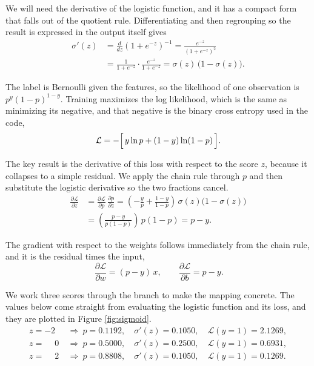 \documentclass[12pt,letterpaper]{article}
\begin{document}
We will need the derivative of the logistic function, and it has a compact form
that falls out of the quotient rule. Differentiating and then regrouping so the
result is expressed in the output itself gives
\begin{align*}
\sigma'(z)
  &= \frac{d}{dz}\left(1 + e^{-z}\right)^{-1}
   = \frac{e^{-z}}{\left(1 + e^{-z}\right)^2} \\
  &= \frac{1}{1+e^{-z}}\cdot\frac{e^{-z}}{1+e^{-z}}
   = \sigma(z)\,\bigl(1 - \sigma(z)\bigr).
\end{align*}

The label is Bernoulli given the features, so the likelihood of one observation
is $p^{y}(1-p)^{1-y}$. Training maximizes the log likelihood, which is the same
as minimizing its negative, and that negative is the binary cross entropy used
in the code,
\[
\mathcal{L} = -\Bigl[\,y \ln p + (1-y)\ln(1-p)\,\Bigr].
\]

The key result is the derivative of this loss with respect to the score $z$,
because it collapses to a simple residual. We apply the chain rule through $p$
and then substitute the logistic derivative so the two fractions cancel.
\begin{align*}
\frac{\partial \mathcal{L}}{\partial z}
  &= \frac{\partial \mathcal{L}}{\partial p}\,\frac{\partial p}{\partial z}
   = \left(-\frac{y}{p} + \frac{1-y}{1-p}\right)\,\sigma(z)\bigl(1-\sigma(z)\bigr) \\
  &= \left(\frac{p - y}{p(1-p)}\right)\,p(1-p)
   = p - y.
\end{align*}

The gradient with respect to the weights follows immediately from the chain
rule, and it is the residual times the input,
\[
\boxed{\,\frac{\partial \mathcal{L}}{\partial w} = (p - y)\,x,
\qquad
\frac{\partial \mathcal{L}}{\partial b} = p - y.}
\]

We work three scores through the branch to make the mapping concrete. The values
below come straight from evaluating the logistic function and its loss, and they
are plotted in Figure \ref{fig:sigmoid}.
\begin{align*}
z = -2 &\ \Rightarrow\ p = 0.1192, \quad \sigma'(z) = 0.1050, \quad \mathcal{L}(y{=}1) = 2.1269, \\
z = \phantom{-}0 &\ \Rightarrow\ p = 0.5000, \quad \sigma'(z) = 0.2500, \quad \mathcal{L}(y{=}1) = 0.6931, \\
z = \phantom{-}2 &\ \Rightarrow\ p = 0.8808, \quad \sigma'(z) = 0.1050, \quad \mathcal{L}(y{=}1) = 0.1269.
\end{align*}
\end{document}
